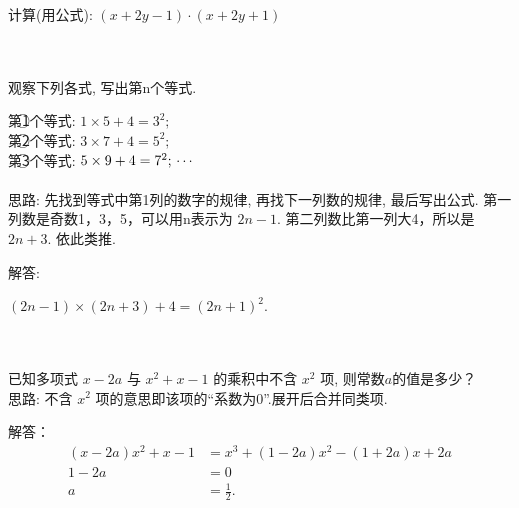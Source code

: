 \begin{comment}
\item {
    计算: $(-xy^2)\cdot (x^2y - 6xy)$
    \\ \\ \\
}

\item {
    计算: $(a+3)(a-1) + a(a-2)$
    \\ \\ \\
}
\end{comment}

\item {
    计算(用公式): $(x+2y-1)\cdot (x+2y+1)$
}
\\ \\ \\

\item {
    观察下列各式, 写出第n个等式.

    第\textcircled{1}个等式: $1\times 5 + 4 = 3^2;$ \\
    第\textcircled{2}个等式: $3\times 7 + 4 = 5^2;$ \\
    第\textcircled{3}个等式: $5\times 9 + 4 = 7^2; \\ \cdots $ \\
    \ifshowSolution
        \fangsong{}
        \\
        思路: 先找到等式中第1列的数字的规律, 再找下一列数的规律, 最后写出公式. 第一列数是奇数1，3，5，可以用n表示为 $2n-1$. 第二列数比第一列大4，所以是$2n+3$. 依此类推.

        解答: 

        $(2n-1)\times (2n+3) + 4 = (2n+1)^2$.
    \else
        \\ \\ \\
    \fi
}

\item {
    已知多项式 $x-2a$ 与 $x^2+x-1$ 的乘积中不含 $x^2$ 项, 则常数$a$的值是多少？
    \ifshowSolution
    \fangsong{}
    \\
    思路: 不含 $x^2$ 项的意思即该项的“系数为0”.展开后合并同类项.

    解答：
    \begin{align*}
        (x-2a)x^2+x-1 &= x^3 + (1-2a)x^2-(1+2a)x + 2a\\
        1-2a &= 0 \\
        a &= \frac12.
    \end{align*}

    \else
        \\ \\ \\
    \fi
}


